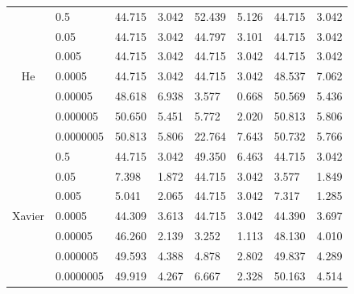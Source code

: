 \begin{table}[H]
\begin{tabular}{cl|llllll|}
\multicolumn{1}{|c|}{\multirow{7}{*}{He}} &
    0.5 &
    44.715 &
    \multicolumn{1}{l|}{3.042} &
    52.439 &
    \multicolumn{1}{l|}{5.126} &
    44.715 &
    3.042 \\
\multicolumn{1}{|c|}{} &
    0.05 &
    44.715 &
    \multicolumn{1}{l|}{3.042} &
    44.797 &
    \multicolumn{1}{l|}{3.101} &
    44.715 &
    3.042 \\
\multicolumn{1}{|c|}{} &
    0.005 &
    44.715 &
    \multicolumn{1}{l|}{3.042} &
    44.715 &
    \multicolumn{1}{l|}{3.042} &
    44.715 &
    3.042 \\
\multicolumn{1}{|c|}{} &
    0.0005 &
    44.715 &
    \multicolumn{1}{l|}{3.042} &
    44.715 &
    \multicolumn{1}{l|}{3.042} &
    48.537 &
    7.062 \\
\multicolumn{1}{|c|}{} &
    0.00005 &
    48.618 &
    \multicolumn{1}{l|}{6.938} &
    3.577 &
    \multicolumn{1}{r|}{0.668} &
    50.569 &
    5.436 \\
\multicolumn{1}{|c|}{} &
    0.000005 &
    50.650 &
    \multicolumn{1}{l|}{5.451} &
    5.772 &
    \multicolumn{1}{r|}{2.020} &
    50.813 &
    5.806 \\
\multicolumn{1}{|c|}{} &
    0.0000005 &
    50.813 &
    \multicolumn{1}{l|}{5.806} &
    22.764 &
    \multicolumn{1}{r|}{7.643} &
    50.732 &
    5.766 \\ \hline
\multicolumn{1}{|c|}{\multirow{7}{*}{Xavier}} &
    0.5 &
    44.715 &
    \multicolumn{1}{l|}{3.042} &
    49.350 &
    \multicolumn{1}{l|}{6.463} &
    44.715 &
    \multicolumn{1}{r|}{3.042} \\
\multicolumn{1}{|c|}{} &
    0.05 &
    7.398 &
    \multicolumn{1}{l|}{1.872} &
    44.715 &
    \multicolumn{1}{l|}{3.042} &
    3.577 &
    1.849 \\
\multicolumn{1}{|c|}{} &
    0.005 &
    5.041 &
    \multicolumn{1}{l|}{2.065} &
    44.715 &
    \multicolumn{1}{l|}{3.042} &
    7.317 &
    1.285 \\
\multicolumn{1}{|c|}{} &
    0.0005 &
    44.309 &
    \multicolumn{1}{l|}{3.613} &
    44.715 &
    \multicolumn{1}{r|}{3.042} &
    44.390 &
    3.697 \\
\multicolumn{1}{|c|}{} &
    0.00005 &
    46.260 &
    \multicolumn{1}{l|}{2.139} &
    3.252 &
    \multicolumn{1}{r|}{1.113} &
    48.130 &
    4.010 \\
\multicolumn{1}{|c|}{} &
    0.000005 &
    49.593 &
    \multicolumn{1}{l|}{4.388} &
    4.878 &
    \multicolumn{1}{l|}{2.802} &
    49.837 &
    4.289 \\
\multicolumn{1}{|c|}{} &
    0.0000005 &
    49.919 &
    \multicolumn{1}{l|}{4.267} &
    6.667 &
    \multicolumn{1}{l|}{2.328} &
    50.163 &
    4.514 \\ \hline
\end{tabular}
\label{table:vggsinhard}
\end{table}

